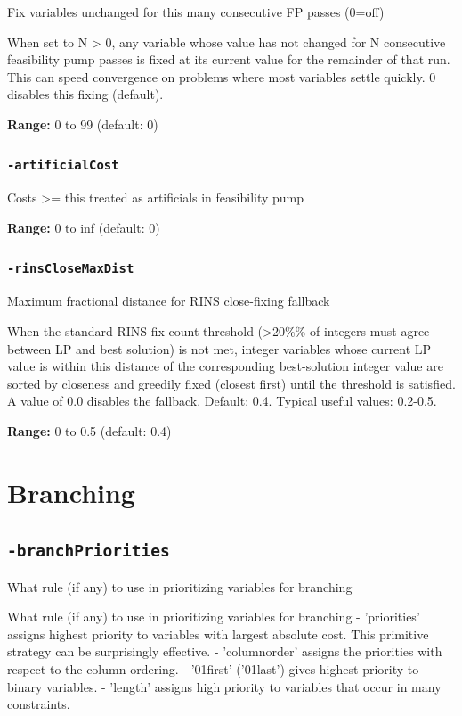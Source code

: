 \documentclass[11pt,a4paper]{article}
\begin{document}
Fix variables unchanged for this many consecutive FP passes (0=off)

When set to N > 0, any variable whose value has not changed for N consecutive feasibility pump passes is fixed at its current value for the remainder of that run. This can speed convergence on problems where most variables settle quickly. 0 disables this fixing (default).

\textbf{Range:} 0 to 99 (default: 0)

\subsubsection*{\texttt{-artificialCost}}

Costs >= this treated as artificials in feasibility pump

\textbf{Range:} 0 to inf (default: 0)

\subsubsection*{\texttt{-rinsCloseMaxDist}}

Maximum fractional distance for RINS close-fixing fallback

When the standard RINS fix-count threshold (>20\%\% of integers must agree between LP and best solution) is not met, integer variables whose current LP value is within this distance of the corresponding best-solution integer value are sorted by closeness and greedily fixed (closest first) until the threshold is satisfied. A value of 0.0 disables the fallback. Default: 0.4. Typical useful values: 0.2-0.5.

\textbf{Range:} 0 to 0.5 (default: 0.4)

\section{Branching}

\subsection*{\texttt{-branchPriorities}}

What rule (if any) to use in prioritizing variables for branching

What rule (if any) to use in prioritizing variables for branching
 - 'priorities' assigns highest priority to variables with largest absolute cost.
                This primitive strategy can be surprisingly effective. 
 - 'columnorder' assigns the priorities with respect to the column ordering.
 - '01first' ('01last') gives highest priority to binary variables.
 - 'length' assigns high priority to variables that occur in many constraints.
\end{document}
